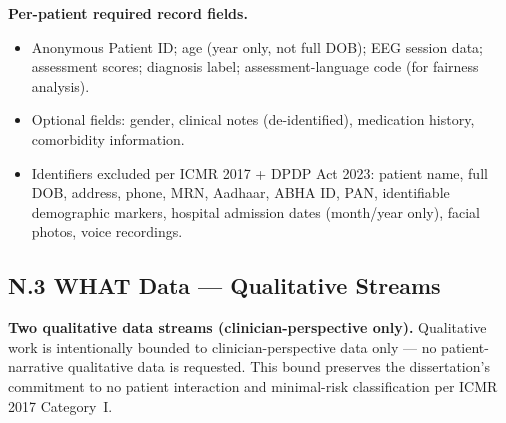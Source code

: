 \noindent\textbf{Per-patient required record fields.}
\begin{itemize}[leftmargin=*, itemsep=2pt]
    \item Anonymous Patient ID; age (year only, not full DOB); EEG session data; assessment scores; diagnosis label; assessment-language code (for fairness analysis).
    \item Optional fields: gender, clinical notes (de-identified), medication history, comorbidity information.
    \item Identifiers excluded per ICMR 2017 + DPDP Act 2023: patient name, full DOB, address, phone, MRN, Aadhaar, ABHA ID, PAN, identifiable demographic markers, hospital admission dates (month/year only), facial photos, voice recordings.
\end{itemize}

\subsection*{N.3 WHAT Data --- Qualitative Streams}
\label{sec:appendix_n_what_qualitative}

\noindent\textbf{Two qualitative data streams (clinician-perspective only).} Qualitative work is intentionally bounded to clinician-perspective data only --- no patient-narrative qualitative data is requested. This bound preserves the dissertation's commitment to no patient interaction and minimal-risk classification per ICMR 2017 Category~I.

